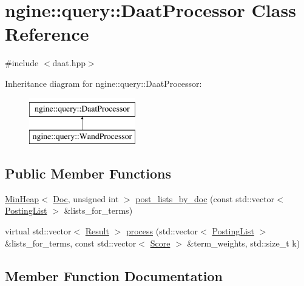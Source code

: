 \hypertarget{classngine_1_1query_1_1DaatProcessor}{}\section{ngine\+:\+:query\+:\+:Daat\+Processor Class Reference}
\label{classngine_1_1query_1_1DaatProcessor}


{\ttfamily \#include $<$daat.\+hpp$>$}

Inheritance diagram for ngine\+:\+:query\+:\+:Daat\+Processor\+:\begin{figure}[H]
\begin{center}
\leavevmode
\includegraphics[height=2.000000cm]{classngine_1_1query_1_1DaatProcessor}
\end{center}
\end{figure}
\subsection*{Public Member Functions}
\begin{DoxyCompactItemize}
\item 
\hyperlink{classngine_1_1MinHeap}{Min\+Heap}$<$ \hyperlink{structngine_1_1Doc}{Doc}, unsigned int $>$ \hyperlink{classngine_1_1query_1_1DaatProcessor_ab7bd0ce89c12129fb9d14eadf3ee87ad}{post\+\_\+lists\+\_\+by\+\_\+doc} (const std\+::vector$<$ \hyperlink{classngine_1_1PostingList}{Posting\+List} $>$ \&lists\+\_\+for\+\_\+terms)
\item 
virtual std\+::vector$<$ \hyperlink{structngine_1_1query_1_1Result}{Result} $>$ \hyperlink{classngine_1_1query_1_1DaatProcessor_a5d5eee5d923afd4929f05f7f38d25bfb}{process} (std\+::vector$<$ \hyperlink{classngine_1_1PostingList}{Posting\+List} $>$ \&lists\+\_\+for\+\_\+terms, const std\+::vector$<$ \hyperlink{structngine_1_1Score}{Score} $>$ \&term\+\_\+weights, std\+::size\+\_\+t k)
\end{DoxyCompactItemize}


\subsection{Member Function Documentation}
\mbox{\label{classngine_1_1query_1_1DaatProcessor_ab7bd0ce89c12129fb9d14eadf3ee87ad}} 
